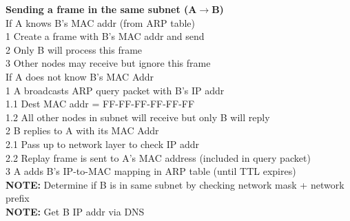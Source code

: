\documentclass[10pt, a4paper]{article}
\newcommand{\highlight}[1]{{\color{red}\textbf{#1}}}
\newcommand{\blue}[1]{{\color{MidnightBlue}#1}}
\newcommand{\red}[1]{{\color{red}#1}}
\newcommand{\tab}[0]{\hspace*{2mm}}
\begin{document}
\begin{multicols*}{3}
		\textbf{Sending a frame in the same subnet (A$\rightarrow$B)}\\
		If A knows B's MAC addr (from ARP table)\\
		\tab 1 Create a frame with B's MAC addr and send\\
		\tab 2 \red{Only B} will process this frame\\
		\tab 3 Other nodes may receive but ignore this frame\\
		If A does not know B's MAC Addr\\
		\tab 1 A \red{broadcasts ARP query packet} with B's \blue{IP addr}\\
		\tab\tab 1.1 Dest MAC addr = FF-FF-FF-FF-FF-FF\\
		\tab\tab 1.2 All other nodes in subnet will receive but only B will reply\\
		\tab 2 B replies to A with its MAC Addr\\
		\tab\tab 2.1 Pass up to network layer to check IP addr\\
		\tab\tab 2.2 Replay frame is sent to A's MAC address (included in query packet)\\
		\tab 3 A adds B's IP-to-MAC mapping in ARP table (until TTL expires)\\
		\highlight{NOTE:} Determine if B is in same subnet by checking network mask + network prefix\\
		\highlight{NOTE:} Get B IP addr via DNS\\
















		

		
		
	\end{multicols*}
\end{document}
